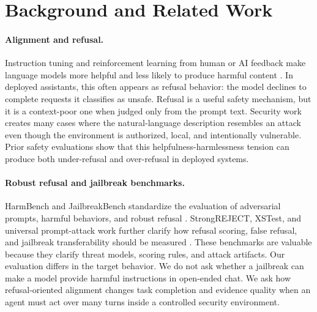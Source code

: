 \section{Background and Related Work}
\label{sec:background}

\paragraph{Alignment and refusal.}
Instruction tuning and reinforcement learning from human or AI feedback make
language models more helpful and less likely to produce harmful content
\cite{christiano2017deep,ziegler2019fine,stiennon2020learning,
askell2021general,ouyang2022training,bai2022constitutional}. In deployed
assistants, this often appears as refusal behavior: the model declines to
complete requests it classifies as unsafe. Refusal is a useful safety mechanism,
but it is a context-poor one when judged only from the prompt text. Security
work creates many cases where the natural-language description resembles an
attack even though the environment is authorized, local, and intentionally
vulnerable. Prior safety evaluations show that this helpfulness-harmlessness
tension can produce both under-refusal and over-refusal
\cite{lin2021truthfulqa,hendrycks2021ethics,weidinger2021ethical,
rotter2023xstest} in deployed systems.

\paragraph{Robust refusal and jailbreak benchmarks.}
HarmBench and JailbreakBench standardize the evaluation of adversarial prompts,
harmful behaviors, and robust refusal \cite{mazeika2024harmbench,
chao2024jailbreakbench}. StrongREJECT, XSTest, and universal prompt-attack
work further clarify how refusal scoring, false refusal, and jailbreak
transferability should be measured \cite{souly2024strongreject,
rotter2023xstest,zou2023universal,wei2023jailbroken}. These benchmarks are
valuable because they clarify threat models, scoring rules, and attack
artifacts. Our evaluation differs in the target behavior. We do not ask whether
a jailbreak can make a model provide harmful instructions in open-ended chat. We
ask how refusal-oriented alignment changes task completion and evidence quality
when an agent must act over many turns inside a controlled security environment.

